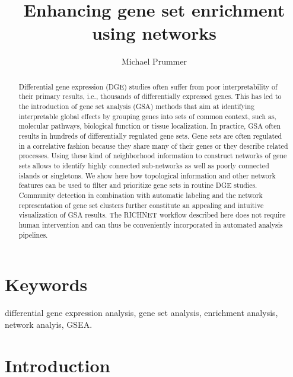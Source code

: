 \documentclass[9pt,a4paper,]{extarticle}
\begin{document}
\pagestyle{front}

\title{Enhancing gene set enrichment using networks}

\author[1]{Michael Prummer}

\maketitle
\thispagestyle{front}

\begin{abstract}
Differential gene expression (DGE) studies often suffer from poor interpretability of their primary results, i.e., thousands of differentially expressed genes. This has led to the introduction of gene set analysis (GSA) methods that aim at identifying interpretable global effects by grouping genes into sets of common context, such as, molecular pathways, biological function or tissue localization. In practice, GSA often results in hundreds of differentially regulated gene sets. Gene sets are often regulated in a correlative fashion because they share many of their genes or they describe related processes. Using these kind of neighborhood information to construct networks of gene sets allows to identify highly connected sub-networks as well as poorly connected islands or singletons. We show here how topological information and other network features can be used to filter and prioritize gene sets in routine DGE studies. Community detection in combination with automatic labeling and the network representation of gene set clusters further constitute an appealing and intuitive visualization of GSA results. The RICHNET workflow described here does not require human intervention and can thus be conveniently incorporated in automated analysis pipelines.
\end{abstract}

\section*{Keywords}
differential gene expression analysis, gene set analysis, enrichment analysis, network analyis, GSEA.


\clearpage
\pagestyle{main}

\section{Introduction}\label{introduction}
\end{document}
